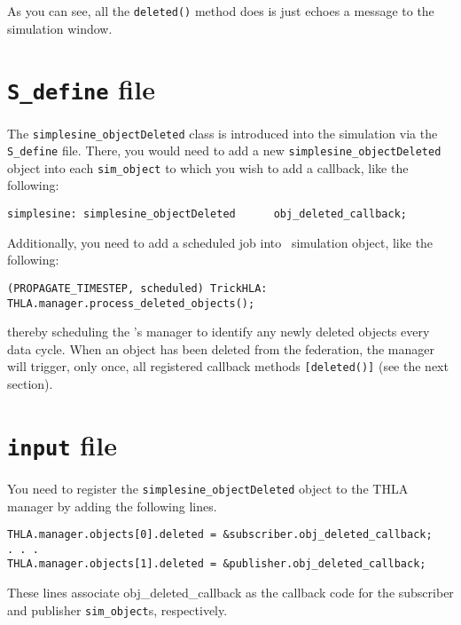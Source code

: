 As you can see, all the {\tt deleted()} method does is just echoes a message 
to the simulation window.

\section{{\tt S\_define} file}

The {\tt simplesine\_objectDeleted} class is introduced into the simulation via 
the {\tt S\_define} file. There, you would need to add a 
new {\tt simplesine\_objectDeleted} object into each {\tt sim\_object} to which 
you wish to add a callback, like the following:

\begin{verbatim}
simplesine: simplesine_objectDeleted      obj_deleted_callback;
\end{verbatim}

Additionally, you need to add a scheduled job into \TrickHLA\ simulation 
object, like the following:

\begin{verbatim}
(PROPAGATE_TIMESTEP, scheduled) TrickHLA: THLA.manager.process_deleted_objects();
\end{verbatim}

thereby scheduling the \TrickHLA's manager to identify any newly deleted 
objects every data cycle. When an object has been deleted from the federation, 
the manager will trigger, only once, all registered callback 
methods {\tt [deleted()]} (see the next section).


\section{{\tt input} file}

You need to register the {\tt simplesine\_objectDeleted} object to the THLA 
manager by adding the following lines.

\begin{verbatim}
THLA.manager.objects[0].deleted = &subscriber.obj_deleted_callback;
. . .
THLA.manager.objects[1].deleted = &publisher.obj_deleted_callback;
\end{verbatim}

These lines associate obj\_deleted\_callback as the callback code for the 
subscriber and publisher {\tt sim\_object}s, respectively.

